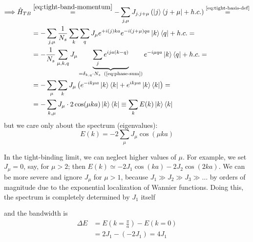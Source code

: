 \begin{align*}
    \Longrightarrow \hat{H}_{TB} &\overset{\ref{eq:tight-band-momentum}}{=} -\sum_{j,\mu} J_{j.j+\mu}
    \left( \ket{j}\bra{j+\mu} + h.c. \right)
        \overset{\text{\ref{eq:tight-basis-def}}}{=}\\
    &= -\sum_{j,\mu} \frac{1}{N_s}\sum_k\sum_q  J_\mu e^{+i(j)ka} e^{-i(j+\mu)qa} \ket{k}\bra{q} + h.c. = \\
    &= - \frac{1}{N_s}\sum_{\mu,k,q}
        J_\mu \underbrace{\sum_{j} e^{ija(k-q)}}_{=\delta_{k,q}\cdot N_s \;\; \text{(\ref{eq:phase-sum})}} e^{-i\mu qa} \ket{k}\bra{q} + h.c. =\\
    &= -\sum_\mu\sum_k J_\mu
        \left( e^{-ik\mu a} \ket{k}\bra{k} + e^{ik\mu a} \ket{k}\bra{k} \right) =\\
    &= -\sum_{k,\mu} J_\mu \cdot 2\cos(\mu ka) \ket{k}\bra{k} \equiv \sum_k E(k) \ket{k}\bra{k}
\end{align*}
but we care only about the spectrum (eigenvalues):
\begin{equation}
\label{eq:spectrum-tight-binding}
    E(k) = -2\sum_\mu J_\mu \cos{(\mu ka)}
\end{equation}

In the tight-binding limit, we can neglect higher values of $\mu$. For example, we set $J_\mu = 0$, say, for $\mu > 2$; then $E(k) \simeq -2J_1 \cos{(ka)} -2J_2 \cos{(2ka)}$.
%
We can be more severe and ignore $J_\mu$ for $\mu > 1$, because $J_1 \gg J_2 \gg J_3 \gg \dots$ by orders of magnitude due to the exponential localization of Wannier functions. Doing this, the spectrum is completely determined by $J_1$ itself

\begin{minipage}{0.50\textwidth}
    \begin{center}
    \scalebox{0.95}{  }
    \end{center}
\end{minipage}\hfill
\begin{minipage}{0.40\textwidth}
    and the bandwidth is
    \begin{align*}
        \Delta E &= E\left(k=\frac{\pi}{a}\right) - E\left(k=0\right)\\
        &= 2J_1 - (- 2J_1) = 4J_1
    \end{align*}
\end{minipage}


